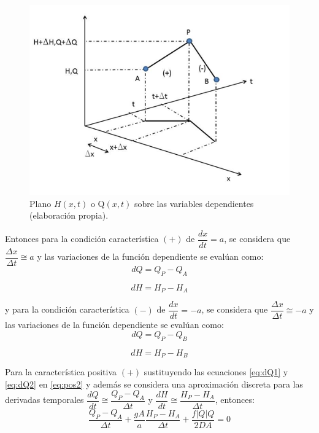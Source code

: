 \documentclass[letterpaper]{report}
\begin{document}
\begin{figure}
	\centering
	\includegraphics[width=0.8\linewidth]{figuras/fig22}
	\caption{Plano $H(x,t)$ o Q$(x,t)$ sobre las variables dependientes (elaboración propia).}
	\label{fig:fig22}
\end{figure}
\newpage

Entonces para la condición característica $(+)$ de $\dfrac{dx}{dt}=a$, se considera que $\dfrac{\Delta x}{\Delta t}\cong a$ y las variaciones de la función dependiente se evalúan como:
\begin{equation}
	dQ=Q_P-Q_A
\label{eq:dQ1}
\end{equation}

\begin{equation}
	dH=H_P-H_A
\label{eq:dQ2}
\end{equation}

y para la condición característica $(-)$ de $\dfrac{dx}{dt}=-a$, se considera que $\dfrac{\Delta x}{\Delta t}\cong -a$ y las variaciones de la función dependiente se evalúan como:
\begin{equation}
	dQ=Q_P-Q_B
	\label{eq:dQ3}
\end{equation}

\begin{equation}
	dH=H_P-H_B
\label{eq:dQ4}
\end{equation}

Para la característica positiva $(+)$ sustituyendo las ecuaciones \ref{eq:dQ1} y \ref{eq:dQ2} en \ref{eq:pos2} y además se considera una aproximación discreta para las derivadas temporales $\dfrac{dQ}{dt}\cong \dfrac{Q_P-Q_A}{\Delta t}$ y $\dfrac{dH}{dt} \cong \dfrac{H_P-H_A}{\Delta t}$, entonces:
\begin{equation}
	\dfrac{Q_P-Q_A}{\Delta t} + \dfrac{gA}{a}\dfrac{H_P-H_A}{\Delta t}+\dfrac{f|Q|Q}{2DA}=0
\end{equation}
\end{document}
